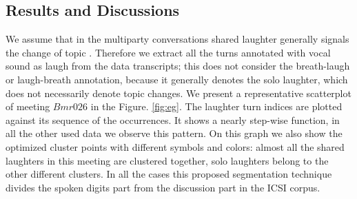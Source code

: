 \documentclass{article}
\begin{document}
\subsection{Results and Discussions}
We assume that in the multiparty conversations shared laughter generally signals the change of topic \cite{holt-10}. Therefore we extract all the turns annotated with vocal sound as laugh from the data transcripts; this does not consider the breath-laugh or laugh-breath annotation, because it generally denotes the solo laughter, which does not necessarily denote topic changes. 
%
We present a representative scatterplot of meeting $Bmr026$ in the Figure. \ref{fig:eg}. The laughter turn indices are plotted against its sequence of the occurrences. It shows a nearly step-wise function, in all the other used data we observe this pattern. On this graph we also show the optimized cluster points with different symbols and colors: almost all the shared laughters in this meeting are clustered together, solo laughters belong to the other different clusters. In all the cases this proposed segmentation technique divides the spoken digits part from the discussion part in the ICSI corpus. 
\end{document}

